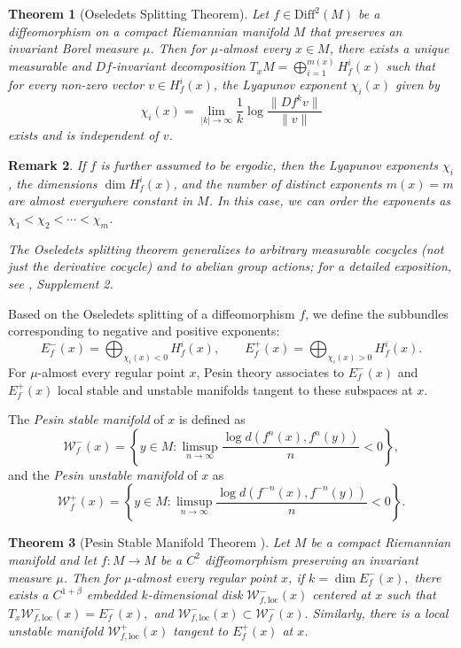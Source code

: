 \documentclass[11pt]{amsart}
\numberwithin{equation}{section}
\theoremstyle{plain}
\newtheorem{thm}{Theorem}[section]
\newtheorem{rmk}[thm]{Remark}
\begin{document}
\begin{thm}[Oseledets Splitting Theorem]\label{Oseled}
Let $f\in \mathrm{Diff}^2(M)$ be a diffeomorphism on a compact Riemannian manifold $M$ that preserves an invariant Borel measure $\mu$. Then for $\mu$-almost every $x\in M$, there exists a unique measurable and $Df$-invariant decomposition $T_xM=\bigoplus_{i=1}^{m(x)} H^i_f(x)$ such that for every non-zero vector $v\in H^i_f(x)$, the \emph{Lyapunov exponent} $\chi_i(x)$ given by
\[
\chi_i(x)=\lim_{|k|\to \infty} \frac{1}{k} \log \frac{\|Df^k v\|}{\|v\|}
\]
exists and is independent of $v$.
\end{thm}

\begin{rmk}
If $f$ is further assumed to be ergodic, then the Lyapunov exponents $\chi_i$, the dimensions $\dim H^i_f(x)$, and the number of distinct exponents $m(x)=m$ are almost everywhere constant in $M$. In this case, we can order the exponents as $\chi_1 < \chi_2 < \cdots < \chi_m$.

The Oseledets splitting theorem generalizes to arbitrary measurable cocycles (not just the derivative cocycle) and to abelian group actions; for a detailed exposition, see \cite{introdyn}, Supplement 2.
\end{rmk}

Based on the Oseledets splitting of a diffeomorphism $f$, we define the subbundles corresponding to negative and positive exponents:
\[
E^-_f(x)=\bigoplus_{\chi_i(x)<0} H^i_f(x), \qquad
E^+_f(x)=\bigoplus_{\chi_i(x)>0} H^i_f(x).
\]
For $\mu$-almost every regular point $x$, Pesin theory associates to
$E^-_f(x)$ and $E^+_f(x)$ local stable and unstable manifolds tangent
to these subspaces at $x$.

The \emph{Pesin stable manifold} of $x$ is defined as
\[
\mathcal{W}^-_f(x)=\left\{y\in M : \limsup_{n\to \infty}\frac{\log d(f^n(x),f^n(y))}{n}<0\right\},
\]
and the \emph{Pesin unstable manifold} of $x$ as
\[
\mathcal{W}^+_f(x)=\left\{y\in M : \limsup_{n\to \infty}\frac{\log d(f^{-n}(x),f^{-n}(y))}{n}<0\right\}.
\]


\begin{thm}[Pesin Stable Manifold Theorem {\cite{Pes}}]\label{pesin}
Let $M$ be a compact Riemannian manifold and let $f:M\to M$ be a $C^2$
diffeomorphism preserving an invariant measure $\mu$. Then for
$\mu$-almost every regular point $x$, if
$
k=\dim E^-_f(x),$ 
there exists a $C^{1+\beta}$ embedded $k$-dimensional disk
$\mathcal{W}^-_{f,\mathrm{loc}}(x)$ centered at $x$ such that
$
T_x\mathcal{W}^-_{f,\mathrm{loc}}(x)=E^-_f(x),
$
and
$
\mathcal{W}^-_{f,\mathrm{loc}}(x)\subset \mathcal{W}^-_f(x).
$
Similarly, there is a local unstable manifold
$\mathcal{W}^+_{f,\mathrm{loc}}(x)$ tangent to $E^+_f(x)$ at $x$.
\end{thm}
\end{document}
